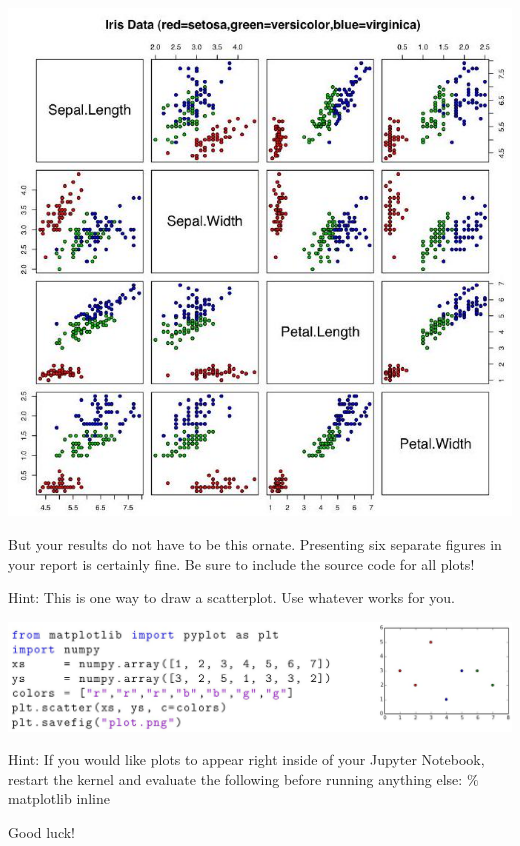 \documentclass[10pt, a4paper]{article}
\begin{document}
\begin{Problem}
\begin{enumerate}
\begin{center}
\includegraphics[max width=\textwidth, scale=0.5]{2023_09_05_cccc75871700a893fedfg-3}
\end{center}

But your results do not have to be this ornate. Presenting six separate figures in your report is certainly fine. Be sure to include the source code for all plots!

Hint: This is one way to draw a scatterplot. Use whatever works for you.

\includegraphics[max width=\textwidth, scale=0.9]{2023_09_05_cccc75871700a893fedfg-3(1)}

Hint: If you would like plots to appear right inside of your Jupyter Notebook, restart the kernel and evaluate the following before running anything else: $\%$ matplotlib inline

Good luck!
\end{enumerate}
\end{Problem}
\end{document}
